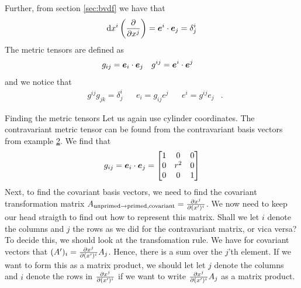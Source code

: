 \documentclass[a4paper, 12pt]{article}
\begin{document}
Further, from section \ref{sec:bvdf} we have that
%
\begin{align*}
 \text{d} x^i \left(\frac{\partial {}}{\partial{x^j}}\right) = \boldsymbol{e}^i\cdot\boldsymbol{e}_j = \delta^i_j
\end{align*}
%
The metric tensors are defined as
%
\begin{align*}
 &g_{ij} = \boldsymbol{e}_i\cdot\boldsymbol{e}_j&
 &g^{ij} = \boldsymbol{e}^i\cdot\boldsymbol{e}^j
\end{align*}
%
and we notice that
%
\begin{align*}
 &g^{ij} g_{jk} = \delta^i_j&
 &e_i = g_{ij}e^j &
 &e^i = g^{ij}e_j&.
\end{align*}
%
\begin{example}{Finding the metric tensors}
 \label{ex:fmt}
 Let us again use cylinder coordinates.
 The contravariant metric tensor can be found from the contravariant
 basis vectors from example \hyperref[ex:vft]{2}. We find that
 \begin{align*}
  g_{ij} = \boldsymbol{e}_i\cdot\boldsymbol{e}_j =
  \begin{bmatrix}
   1 & 0 & 0\\
   0 & r^2 & 0\\
   0 & 0 & 1
  \end{bmatrix}
 \end{align*}
 Next, to find the covariant basis vectors, we need to find the covariant
 transformation matrix $A_{\text{unprimed}\to \text{primed}, \text{covariant}}
 = \frac{\partial {x^j}}{\partial{(x')^i}}$. We now need to keep our head straigth to find out how
 to represent this matrix. Shall we let $i$ denote the columns and $j$ the
 rows as we did for the contravariant matrix, or vica versa? To decide this, we
 should look at the transfomation rule. We have for covariant vectors that
 $(A')_i = \frac{\partial {x^j}}{\partial{(x')^i}} A_j$. Hence, there is a sum over the $j$'th
 element. If we want to form this as a matrix product, we should let let $j$
 denote the columns and $i$ denote the rows in $\frac{\partial {x^j}}{\partial{(x')^i}}$ if we want
 to write $\frac{\partial {x^j}}{\partial{(x')^i}} A_j$ as a matrix product.


\end{example}
\end{document}
